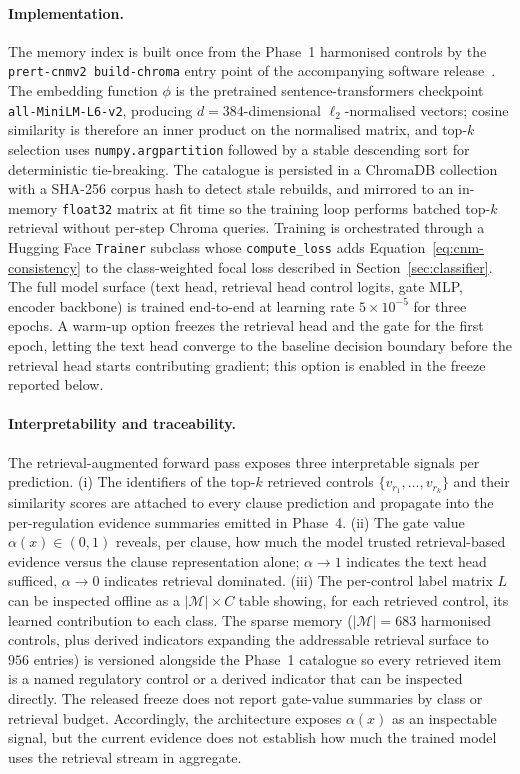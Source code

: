 \documentclass[final,3p,times,twocolumn]{elsarticle}
\begin{document}
	\paragraph{Implementation.}
	The memory index is built once from the Phase~1 harmonised controls by the
	\texttt{prert-cnmv2 build-chroma} entry point of the accompanying software release~\citep{prertcnm_github}.
	The embedding function $\phi$ is the pretrained sentence-transformers checkpoint
	\texttt{all-MiniLM-L6-v2}, producing $d = 384$-dimensional $\ell_{2}$-normalised
	vectors; cosine similarity is therefore an inner product on the normalised
	matrix, and top-$k$ selection uses \texttt{numpy.argpartition} followed by a
	stable descending sort for deterministic tie-breaking. The catalogue is persisted
	in a ChromaDB collection with a SHA-256 corpus hash to detect stale rebuilds,
	and mirrored to an in-memory \texttt{float32} matrix at fit time so the training
	loop performs batched top-$k$ retrieval without per-step Chroma queries.
	Training is orchestrated through a Hugging Face \texttt{Trainer} subclass whose
	\texttt{compute\_loss} adds Equation~\ref{eq:cnm-consistency} to the class-weighted
	focal loss described in Section~\ref{sec:classifier}. The full model surface (text
	head, retrieval head control logits, gate MLP, encoder backbone) is trained
	end-to-end at learning rate $5 \times 10^{-5}$ for three epochs. A warm-up option
	freezes the retrieval head and the gate for the first epoch, letting the text
	head converge to the baseline decision boundary before the retrieval head
	starts contributing gradient; this option is enabled in the freeze reported below.

	\paragraph{Interpretability and traceability.}
	The retrieval-augmented forward pass exposes three interpretable signals per
	prediction. (i) The identifiers of the top-$k$ retrieved controls $\{v_{r_1}, \ldots
	, v_{r_k}\}$ and their similarity scores are attached to every clause prediction
	and propagate into the per-regulation evidence summaries emitted in Phase~4. (ii)
	The gate value $\alpha(x) \in (0,1)$ reveals, per clause, how much the model trusted
	retrieval-based evidence versus the clause representation alone;
	$\alpha \to 1$ indicates the text head sufficed, $\alpha \to 0$ indicates retrieval
	dominated. (iii) The per-control label matrix $L$ can be inspected offline as
	a $|\mathcal{M}| \times C$ table showing, for each retrieved control, its
	learned contribution to each class. The sparse memory ($|\mathcal{M}| = 683$
	harmonised controls, plus derived indicators expanding the addressable retrieval
	surface to $956$ entries) is versioned alongside the Phase~1 catalogue so
	every retrieved item is a named regulatory control or a derived indicator that
	can be inspected directly.
	The released freeze does not report gate-value summaries by class or retrieval
	budget. Accordingly, the architecture exposes $\alpha(x)$ as an inspectable
	signal, but the current evidence does not establish how much the trained model
	uses the retrieval stream in aggregate.
\end{document}
